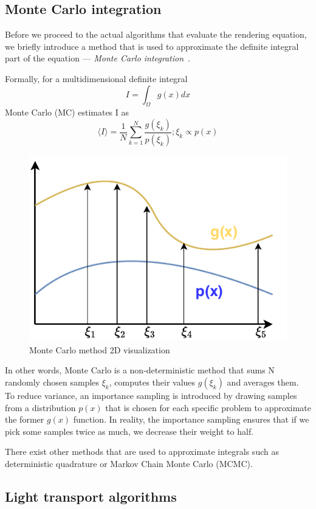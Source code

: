 \subsection{Monte Carlo integration}
Before we proceed to the actual algorithms that evaluate the rendering equation, we briefly introduce a method that is used to approximate the definite integral part of the equation --- \emph{Monte Carlo integration}~\cite{caflisch1998monte}.

Formally, for a multidimensional definite integral
\begin{equation}
I=\int_{\Omega}g(x)dx
\end{equation}
 Monte Carlo (MC) estimates I as 
 \begin{equation}
 \langle I\rangle=\frac{1}{N}\sum_{k=1}^{N}\frac{g(\xi_k)}{p(\xi_k)}; \xi_k\propto p(x)
 \end{equation}

\begin{figure}[H]
	\centering
	\includegraphics[width=0.5\linewidth]{img/monte_carlo.pdf}
	\caption{Monte Carlo method 2D visualization}
\end{figure}

In other words, Monte Carlo is a non-deterministic method that sums N randomly chosen samples $\xi_k$, computes their values $g(\xi_k)$ and averages them. To reduce variance, an importance sampling is introduced by drawing samples from a distribution $p(x)$ that is chosen for each specific problem to approximate the former $g(x)$ function. In reality, the importance sampling ensures that if we pick some samples twice as much, we decrease their weight to half.

There exist other methods that are used to approximate integrals such as deterministic quadrature or Markov Chain Monte Carlo (MCMC).

\subsection{Light transport algorithms}

